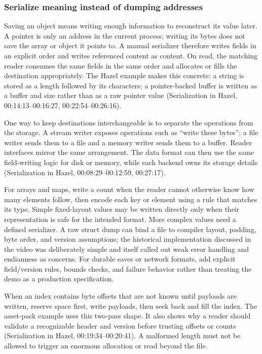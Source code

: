 \subsubsection{Serialize meaning instead of dumping addresses}\label{06-engine-ii-ch032-serialize-meaning-instead-of-dumping-addresses}

Saving an object means writing enough information to reconstruct its value later. A pointer is only an address in the current process; writing its bytes does not save the array or object it points to. A manual serializer therefore writes fields in an explicit order and writes referenced content as content. On read, the matching reader consumes the same fields in the same order and allocates or fills the destination appropriately. The Hazel example makes this concrete: a string is stored as a length followed by its characters; a pointer-backed buffer is written as a buffer and size rather than as a raw pointer value (Serialization in Hazel, 00:14:13--00:16:27, 00:22:54--00:26:16).

One way to keep destinations interchangeable is to separate the operations from the storage. A stream writer exposes operations such as ``write these bytes''; a file writer sends them to a file and a memory writer sends them to a buffer. Reader interfaces mirror the same arrangement. The data format can then use the same field-writing logic for disk or memory, while each backend owns its storage details (Serialization in Hazel, 00:08:29--00:12:59, 00:27:17).

For arrays and maps, write a count when the reader cannot otherwise know how many elements follow, then encode each key or element using a rule that matches its type. Simple fixed-layout values may be written directly only when their representation is safe for the intended format. More complex values need a defined serializer. A raw struct dump can bind a file to compiler layout, padding, byte order, and version assumptions; the historical implementation discussed in the video was deliberately simple and itself called out weak error handling and endianness as concerns. For durable saves or network formats, add explicit field/version rules, bounds checks, and failure behavior rather than treating the demo as a production specification.

When an index contains byte offsets that are not known until payloads are written, reserve space first, write payloads, then seek back and fill the index. The asset-pack example uses this two-pass shape. It also shows why a reader should validate a recognizable header and version before trusting offsets or counts (Serialization in Hazel, 00:19:34--00:20:41). A malformed length must not be allowed to trigger an enormous allocation or read beyond the file.

